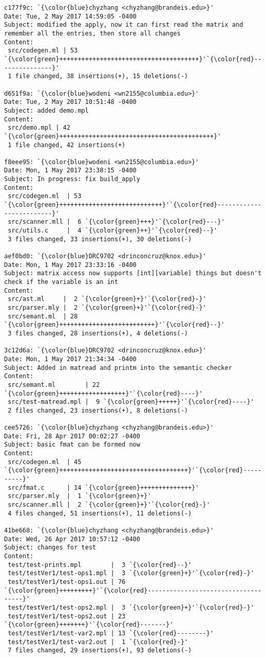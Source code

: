 \begin{lstlisting}
c177f9c: `{\color{blue}chyzhang <chyzhang@brandeis.edu>}'
Date: Tue, 2 May 2017 14:59:05 -0400
Subject: modified the apply, now it can first read the matrix and remember all the entries, then store all changes
Content: 
 src/codegen.ml | 53 `{\color{green}++++++++++++++++++++++++++++++++++++++}'`{\color{red}---------------}'
 1 file changed, 38 insertions(+), 15 deletions(-)

d651f9a: `{\color{blue}wodeni <wn2155@columbia.edu>}'
Date: Tue, 2 May 2017 10:51:48 -0400
Subject: added demo.mpl
Content: 
 src/demo.mpl | 42 `{\color{green}++++++++++++++++++++++++++++++++++++++++++}'
 1 file changed, 42 insertions(+)

f8eee95: `{\color{blue}wodeni <wn2155@columbia.edu>}'
Date: Mon, 1 May 2017 23:38:15 -0400
Subject: In progress: fix build_apply
Content: 
 src/codegen.ml  | 53 `{\color{green}++++++++++++++++++++++++++++}'`{\color{red}-------------------------}'
 src/scanner.mll |  6 `{\color{green}+++}'`{\color{red}---}'
 src/utils.c     |  4 `{\color{green}++}'`{\color{red}--}'
 3 files changed, 33 insertions(+), 30 deletions(-)

aef0bd0: `{\color{blue}DRC9702 <drinconcruz@knox.edu>}'
Date: Mon, 1 May 2017 23:33:16 -0400
Subject: matrix access now supports [int][variable] things but doesn't check if the variable is an int
Content: 
 src/ast.ml     |  2 `{\color{green}+}'`{\color{red}-}'
 src/parser.mly |  2 `{\color{green}+}'`{\color{red}-}'
 src/semant.ml  | 28 `{\color{green}++++++++++++++++++++++++++}'`{\color{red}--}'
 3 files changed, 28 insertions(+), 4 deletions(-)

3c12d6a: `{\color{blue}DRC9702 <drinconcruz@knox.edu>}'
Date: Mon, 1 May 2017 21:34:34 -0400
Subject: Added in matread and printm into the semantic checker
Content: 
 src/semant.ml        | 22 `{\color{green}++++++++++++++++++}'`{\color{red}----}'
 src/test-matread.mpl |  9 `{\color{green}+++++}'`{\color{red}----}'
 2 files changed, 23 insertions(+), 8 deletions(-)

cee5726: `{\color{blue}chyzhang <chyzhang@brandeis.edu>}'
Date: Fri, 28 Apr 2017 00:02:27 -0400
Subject: basic fmat can be formed now
Content: 
 src/codegen.ml  | 45 `{\color{green}+++++++++++++++++++++++++++++++++++}'`{\color{red}----------}'
 src/fmat.c      | 14 `{\color{green}++++++++++++++}'
 src/parser.mly  |  1 `{\color{green}+}'
 src/scanner.mll |  2 `{\color{green}+}'`{\color{red}-}'
 4 files changed, 51 insertions(+), 11 deletions(-)

41be668: `{\color{blue}chyzhang <chyzhang@brandeis.edu>}'
Date: Wed, 26 Apr 2017 10:57:12 -0400
Subject: changes for test
Content: 
 test/test-prints.mpl        |  3 `{\color{red}--}'
 test/testVer1/test-ops1.mpl |  3 `{\color{green}+}'`{\color{red}-}'
 test/testVer1/test-ops1.out | 76 `{\color{green}+++++++++}'`{\color{red}------------------------------------}'
 test/testVer1/test-ops2.mpl |  3 `{\color{green}+}'`{\color{red}-}'
 test/testVer1/test-ops2.out | 23 `{\color{green}+++++++}'`{\color{red}-------}'
 test/testVer1/test-var2.mpl | 13 `{\color{red}--------}'
 test/testVer1/test-var2.out |  1 `{\color{red}-}'
 7 files changed, 29 insertions(+), 93 deletions(-)


\end{lstlisting}
